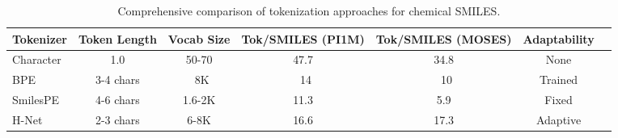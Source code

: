 
\begin{table}[t]
\caption{Comprehensive comparison of tokenization approaches for chemical SMILES.}
\label{tab:tokenizer_comparison}
\vskip 0.1in
\begin{center}
\begin{small}
\begin{tabular}{lcccccc}
\toprule
Tokenizer & Token Length & Vocab Size & Tok/SMILES (PI1M) & Tok/SMILES (MOSES) & Adaptability \\
\midrule
Character & 1.0 & 50-70 & 47.7 & 34.8 & None \\
BPE & 3-4 chars & ~8K & ~14 & ~10 & Trained \\
SmilesPE & 4-6 chars & 1.6-2K & 11.3 & 5.9 & Fixed \\
H-Net & 2-3 chars & 6-8K & 16.6 & 17.3 & Adaptive \\
\bottomrule
\end{tabular}
\end{small}
\end{center}
\vskip -0.1in
\end{table}
